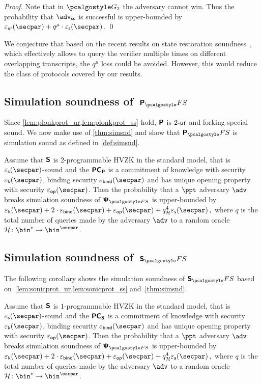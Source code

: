 \begin{proof}
	Note that in $\game{2}$ the adversary cannot win. Thus the probability
	that $\advss$ is successful is upper-bounded by
	$\epsur(\secpar) + q^{\mu} \cdot \epss(\secpar)$.  \qed
\end{proof}


We conjecture that based on the recent results on state restoration soundness~\cite{cryptoeprint:2020:1351}, which effectively allows to query the verifier multiple times on different overlapping transcripts, the $q^{\mu}$ loss could be avoided. However, this would reduce the class of protocols covered by our results. 


\subsection{Simulation soundness of~$\plonkprotfs$}
Since \cref{lem:plonkprot_ur,lem:plonkprot_ss} hold, $\bm{\mathsf{P}}$ is ${2\text{-}\mathsf{ur}}$
and forking special sound. We now make use of \cref{thm:simsnd} and show that
$\plonkprot_\fs$ is simulation sound as defined in
\cref{def:simsnd}.

 \begin{corollary}
   \label{cor:simsnd-P}
   Assume that $\bm{\mathsf{S}}$ is $2$-programmable HVZK in the standard model, that
   is $\epss(\secpar)$-sound and the $\bm{\mathsf{PC}}_{\bm{\mathsf{P}}}$ is a commitment of knowledge with
   security $\epsk(\secpar)$, binding security $\epsbind(\secpar)$ and has unique
   opening property with security $\epsop(\secpar)$. Then the probability that a
   $\ppt$ adversary $\adv$ breaks simulation soundness of $\ps_{\fs}$ is
   upper-bounded by
   \( \epsk(\secpar) + 2\cdot\epsbind(\secpar) + \epsop(\secpar) + q_\ro^4
   \epss(\secpar)\,, \) where $q$ is the total number of queries made by the
   adversary $\adv$ to a random oracle $\ro\colon \bin^{*} \to \bin^{\secpar}$.
 \end{corollary}

\subsection{Simulation soundness of~$\sonicprotfs$}
The following corollary shows the simulation soundness of $\sonicprotfs$ based on~\cref{lem:sonicprot_ur,lem:sonicprot_ss} and~\cref{thm:simsnd}.
\begin{corollary}
	\label{cor:simsnd-S}
	Assume that $\bm{\mathsf{S}}$ is $1$-programmable HVZK in the standard model, that
	is $\epss(\secpar)$-sound and the $\bm{\mathsf{PC}}_{\bm{\mathsf{S}}}$ is a commitment of knowledge with
	security $\epsk(\secpar)$, binding security $\epsbind(\secpar)$ and has unique
	opening property with security $\epsop(\secpar)$. Then the probability that a
	$\ppt$ adversary $\adv$ breaks simulation soundness of $\ps_{\fs}$ is
	upper-bounded by
	\( \epsk(\secpar) + 2\cdot\epsbind(\secpar) + \epsop(\secpar) + q_\ro^4
	\epss(\secpar)\,, \) where $q$ is the total number of queries made by the
	adversary $\adv$ to a random oracle $\ro\colon \bin^{*} \to \bin^{\secpar}$.
\end{corollary}

